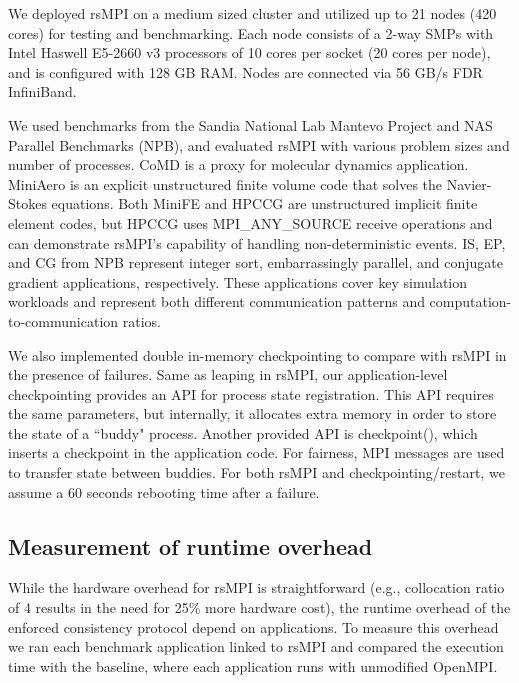 We deployed rsMPI on a medium sized cluster and utilized up to 21 nodes (420 cores) for testing and benchmarking. Each node consists of a 2-way SMPs with Intel Haswell E5-2660 v3 processors of 10 cores per socket (20 cores per node), and is configured with 128 GB RAM. Nodes are connected via 56 GB/s FDR InfiniBand. %

We used benchmarks from the Sandia National Lab Mantevo Project and NAS Parallel Benchmarks (NPB), and evaluated rsMPI with various problem sizes and number of processes. CoMD is a proxy for molecular dynamics application. MiniAero is an explicit unstructured finite volume code that solves the Navier-Stokes equations. Both MiniFE and HPCCG are unstructured implicit finite element codes, but HPCCG uses MPI\_ANY\_SOURCE receive operations and can demonstrate rsMPI's capability of handling non-deterministic events. IS, EP, and CG from NPB represent integer sort, embarrassingly parallel, and conjugate gradient applications, respectively. These applications cover key simulation workloads and represent both different communication patterns and computation-to-communication ratios.

We also implemented double in-memory checkpointing to compare with rsMPI in the presence of failures. 
Same as leaping in rsMPI, our application-level checkpointing provides an API for process state registration. This API requires the same parameters, but internally, it allocates extra memory in order to store the state of a ``buddy" process. Another provided API is checkpoint(), which inserts a checkpoint in the application code. For fairness, MPI messages are used to transfer state between buddies.  
For both rsMPI and checkpointing/restart, we assume a 60 seconds rebooting time after a failure. %

\subsection{Measurement of runtime overhead}
\label{sec:runtime_overhead}
While the hardware overhead for rsMPI is straightforward (e.g., collocation ratio of 4 results in the need for 25\% more hardware cost), the runtime overhead of the enforced consistency protocol depend on applications. To measure this overhead we ran each benchmark application linked to rsMPI and compared the execution time with the baseline, where each application runs with unmodified OpenMPI.


